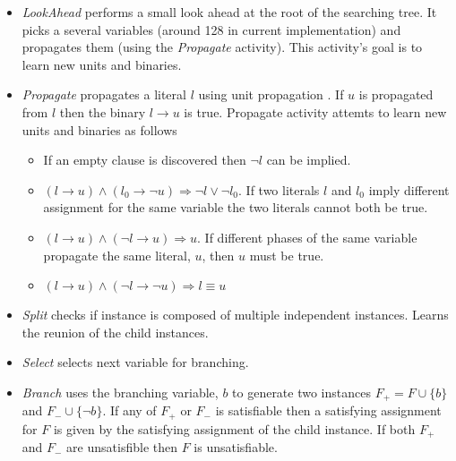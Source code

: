 \begin{itemize}
  \item \emph{LookAhead} performs a small look ahead at the root
  of the searching tree. It picks a several variables (around 128 in
  current implementation) and propagates them (using the \emph{Propagate}
  activity). This activity's goal is to learn new units and binaries.

  \item \emph{Propagate} propagates a literal $l$ using
  unit propagation . If $u$ is propagated from
  $l$ then the binary $l \rightarrow u$ is true.
  Propagate activity attemts to learn new units and binaries as follows

  \begin{itemize}
    \item If an empty clause is discovered then $\neg l$ can be implied.

    \item $(l \rightarrow u) \land (l_0 \rightarrow \neg u) \Rightarrow
    \neg l \lor \neg l_0$. If two literals $l$ and $l_0$ imply different
    assignment for the same variable the two literals cannot both be true.

    \item $(l \rightarrow u) \land (\neg l \rightarrow u) \Rightarrow u$. If
    different phases of the same variable propagate the same literal, $u$,
    then $u$ must be true.

    \item $(l \rightarrow u) \land (\neg l \rightarrow \neg u)
    \Rightarrow l \equiv u$

  \end{itemize}

  \item \emph{Split} checks if instance is composed of multiple independent
  instances. Learns the reunion of the child instances.

  \item \emph{Select} selects next variable for branching.

  \item \emph{Branch} uses the branching variable, $b$ to generate two
  instances $F_+ = F \cup \{b\}$ and $F_- \cup \{\neg b\}$. If any of
  $F_+$ or $F_-$ is satisfiable then a satisfying assignment for
  $F$ is given by the satisfying assignment of the child instance.
  If both $F_+$ and $F_-$ are unsatisfible then $F$ is unsatisfiable.


\end{itemize}
